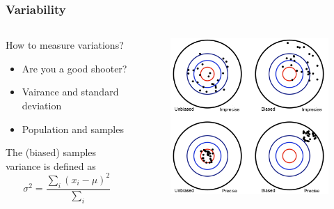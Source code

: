 \documentclass[10pt, compress]{beamer}
\begin{document}
\begin{frame}
    \frametitle{Variability}
    \begin{columns}
        \begin{block}{How to measure variations?}
            \begin{itemize}
                \item \alert{Are you a good shooter?}
                \item Vairance and standard deviation
                \item Population and samples
            \end{itemize}
            \smallskip
            The (biased) samples variance is defined as
            \begin{equation}
                \sigma^2 = \frac{\sum_i (x_i - \mu)^2}{\sum_i}
            \end{equation}
        \end{block}
        \begin{block}{}
            \begin{figure}
                \begin{center}
                    \includegraphics[scale=0.4]{img/std_dvn.png}
                \end{center}
            \end{figure}
        \end{block}
    \end{columns}
\end{frame}
\end{document}
